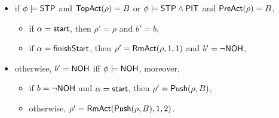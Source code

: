 \begin{itemize}
\begin{itemize}
			\begin{itemize}
				\item if $\phi \models {\sf STP}$ and $\mathsf{TopAct}(\rho) = B$ or $\phi \models {\sf STP}\wedge{\sf PIT}$ and $\mathsf{PreAct}(\rho) = B$, 
				\begin{itemize}
					\item if $\alpha = {\mathsf{start} }$, then $\rho' = \rho$ and $b' = b$,
					\item if $\alpha = {\mathsf{finishStart} }$, then $\rho' = \mathsf{RmAct}(\rho, 1, 1)$ and $b' = \neg {\sf NOH}$,
				\end{itemize}
				\item otherwise, $b' = {\sf NOH}$ iff $\phi \models {\sf NOH}$, moreover,
				\begin{itemize}
					\item if $b = \neg {\sf NOH}$ and $\alpha = {\mathsf{start} }$, then $\rho' = \mathsf{Push}(\rho, B)$, 
					\item otherwise, $\rho' = \mathsf{RmAct}( \mathsf{Push}(\rho, B), 1, 2)$. 
				\end{itemize}
			\end{itemize}
		\end{itemize}
\end{itemize}

\smallskip
\noindent \fbox{$\phi \models \ndmflag$}

